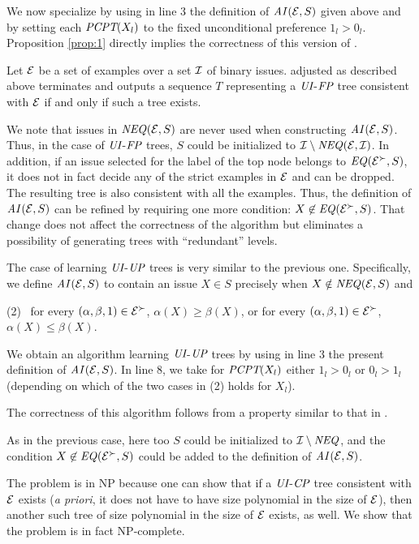 We now specialize  by using in line 3 the 
definition of $\mathit{AI}(\mathcal{E},S)$ given above and by setting each $\textit{PCPT}(X_l)$ 
to the fixed unconditional preference $1_l>0_l$. Proposition \ref{prop:1}
directly implies the correctness of this version of .

\begin{thm}
Let $\mathcal{E}$ be a set of examples over a set $\mathcal{I}$ of binary issues.
 adjusted as described above terminates and outputs
a sequence $T$ representing a $\textit{UI}$-$\textit{FP}$ tree consistent with $\mathcal{E}$ if
and only if such a tree exists.
\end{thm}

We note that issues in $\mathit{NEQ}(\mathcal{E},S)$ are never used when constructing
$\mathit{AI}(\mathcal{E},S)$. Thus, in the case of $\textit{UI}$-$\textit{FP}$ trees, $S$ could be
initialized to $\mathcal{I}\setminus\mathit{NEQ}(\mathcal{E},\mathcal{I})$. In addition, if an issue
selected for the label of the top node belongs to $\mathit{EQ}(\mathcal{E}^\succ, S)$,
it does not in fact decide any of the strict examples in $\mathcal{E}$ and can be
dropped. The resulting tree is also consistent with all the examples. 
Thus, the definition of $\mathit{AI}(\mathcal{E},S)$ can be refined by requiring one more
condition: $X \not \in \mathit{EQ}(\mathcal{E}^\succ, S)$. That change does not affect 
the correctness of the algorithm but eliminates a possibility of generating
trees with ``redundant'' levels.


The case of learning $\textit{UI}$-$\textit{UP}$ trees is very similar to the 
previous one. Specifically, we define $\mathit{AI}(\mathcal{E},S)$ to contain an issue 
$X\in S$ precisely when $X\notin\mathit{NEQ}(\mathcal{E},S)$ and

\noindent 
(2) \ for every $(\alpha,\beta,1) \in \mathcal{E}^\succ$, $\alpha(X) \geq 
\beta(X)$, or for every $(\alpha,\beta,1) \in \mathcal{E}^\succ$, $\alpha(X) \leq \beta(X)$.

We obtain an algorithm learning $\textit{UI}$-$\textit{UP}$ trees by using in line 3
the present definition of $\mathit{AI}(\mathcal{E},S)$. In line 8, we take for 
$\textit{PCPT}(X_l)$ either $1_l>0_l$ or $0_l>1_l$ (depending on which of the two
cases in (2) holds for $X_l$).

The correctness of this algorithm follows from a property similar to
that in .

As in the previous case, here too $S$ could be initialized to $\mathcal{I} \setminus
\mathit{NEQ}$, and the condition $X\not\in \mathit{EQ}(\mathcal{E}^\succ,S)$ could be added to the 
definition of $\mathit{AI}(\mathcal{E},S)$. 

The problem is in NP because one can show that if a $\textit{UI}$-$\textit{CP}$
tree consistent with $\mathcal{E}$ exists (\emph{a priori},
it does not have to have size polynomial in the size of $\mathcal{E}$), then another
such tree of size polynomial in the size of $\mathcal{E}$ exists, as well.
We show that the problem is in fact NP-complete.

